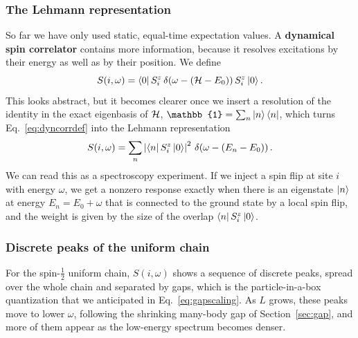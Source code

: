 \documentclass[lecture_notes.tex]{subfiles}
\begin{document}
\subsubsection{The Lehmann representation}
So far we have only used static, equal-time expectation values. A \textbf{dynamical spin correlator}
contains more information, because it resolves excitations by their energy as well as by their
position. We define
\begin{equation}
  S(i,\omega) = \bra{0}S_i^z\,\delta(\omega - (\mathcal{H}-E_0))\,S_i^z\ket{0}.
  \label{eq:dyncorrdef}
\end{equation}
This looks abstract, but it becomes clearer once we insert a resolution of the identity in the exact
eigenbasis of $\mathcal{H}$, $\mathbb{1}=\sum_n\ket{n}\bra{n}$, which turns Eq.~\eqref{eq:dyncorrdef} into
the Lehmann representation
\begin{equation}
  S(i,\omega) = \sum_n \left|\bra{n}S_i^z\ket{0}\right|^2 \, \delta\!\left(\omega - (E_n-E_0)\right).
  \label{eq:lehmann}
\end{equation}
We can read this as a spectroscopy experiment. If we inject a spin flip at site $i$ with energy
$\omega$, we get a nonzero response exactly when there is an eigenstate $\ket{n}$ at energy
$E_n=E_0+\omega$ that is connected to the ground state by a local spin flip, and the weight is given
by the size of the overlap $\bra{n}S_i^z\ket{0}$.

\subsubsection{Discrete peaks of the uniform chain}
For the spin-$\tfrac12$ uniform chain, $S(i,\omega)$ shows a sequence of discrete peaks, spread over
the whole chain and separated by gaps, which is the particle-in-a-box quantization that we
anticipated in Eq.~\eqref{eq:gapscaling}. As $L$ grows, these peaks move to lower $\omega$, following
the shrinking many-body gap of Section~\ref{sec:gap}, and more of them appear as the low-energy
spectrum becomes denser.
\end{document}

